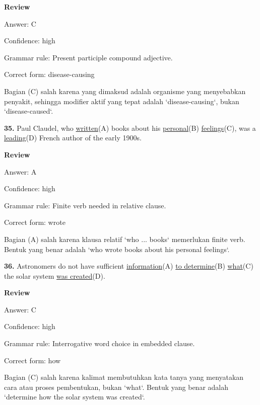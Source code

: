 \documentclass[12pt]{article}
\begin{document}
\par
\begingroup
\setlength{\parskip}{0pt}
\setlength{\parindent}{0pt}
\textbf{Review}\par
Answer: C\par
Confidence: high\par
Grammar rule: Present participle compound adjective.\par
Correct form: disease-causing\par
Bagian (C) salah karena yang dimaksud adalah organisme yang menyebabkan penyakit, sehingga modifier aktif yang tepat adalah `disease-causing`, bukan `disease-caused`.\par
\endgroup
\par
\vspace{\questionblockgap}
\noindent\textbf{35.} Paul Claudel, who \uline{written}(A) books about his \uline{personal}(B) \uline{feelings}(C), was a \uline{leading}(D) French author of the early 1900s.
\par
\begingroup
\setlength{\parskip}{0pt}
\setlength{\parindent}{0pt}
\textbf{Review}\par
Answer: A\par
Confidence: high\par
Grammar rule: Finite verb needed in relative clause.\par
Correct form: wrote\par
Bagian (A) salah karena klausa relatif `who ... books` memerlukan finite verb. Bentuk yang benar adalah `who wrote books about his personal feelings`.\par
\endgroup
\par
\vspace{\questionblockgap}
\noindent\textbf{36.} Astronomers do not have sufficient \uline{information}(A) \uline{to determine}(B) \uline{what}(C) the solar system \uline{was created}(D).
\par
\begingroup
\setlength{\parskip}{0pt}
\setlength{\parindent}{0pt}
\textbf{Review}\par
Answer: C\par
Confidence: high\par
Grammar rule: Interrogative word choice in embedded clause.\par
Correct form: how\par
Bagian (C) salah karena kalimat membutuhkan kata tanya yang menyatakan cara atau proses pembentukan, bukan `what`. Bentuk yang benar adalah `determine how the solar system was created`.\par
\endgroup
\par
\end{document}
